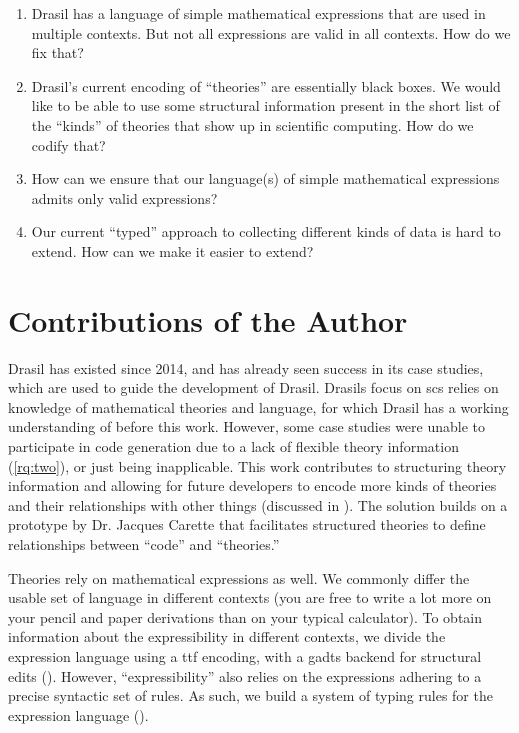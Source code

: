\begin{enumerate}

      \item[\namedlabel{rq:one}{RQ1}] Drasil has a language of simple
            mathematical expressions that are used in multiple contexts. But not
            all expressions are valid in all contexts. How do we fix that?

      \item[\namedlabel{rq:two}{RQ2}] Drasil's current encoding of ``theories''
            are essentially black boxes. We would like to be able to use some
            structural information present in the short list of the ``kinds'' of
            theories that show up in scientific computing. How do we codify
            that?

      \item[\namedlabel{rq:three}{RQ3}] How can we ensure that our language(s)
            of simple mathematical expressions admits only valid expressions?

      \item[\namedlabel{rq:four}{RQ4}] Our current ``typed'' approach to
            collecting different kinds of data is hard to extend. How can we
            make it easier to extend?

\end{enumerate}

\section{Contributions of the Author}
\label{sec:intro:contributions}

Drasil has existed since 2014, and has already seen success in its case studies,
which are used to guide the development of Drasil. Drasils focus on \acs{scs}
relies on knowledge of mathematical theories and language, for which Drasil has
a working understanding of before this work. However, some case studies were
unable to participate in code generation due to a lack of flexible theory
information (\ref{rq:two}), or just being inapplicable. This work contributes to
structuring theory information and allowing for future developers to encode more
kinds of theories and their relationships with other things (discussed in
). The solution builds on a prototype by Dr. Jacques
Carette that facilitates
structured theories to define relationships between ``code'' and ``theories.''

Theories rely on mathematical expressions as well. We commonly differ the usable
set of language in different contexts (you are free to write a lot more on your
pencil and paper derivations than on your typical calculator). To obtain
information about the expressibility in different contexts, we divide the
expression language using a \acs{ttf} \cite{Carette2009} encoding, with a
\acsp{gadt} backend for structural edits (). However,
``expressibility'' also relies on the expressions adhering to a precise
syntactic set of rules. As such, we build a system of typing rules for the
expression language ().

